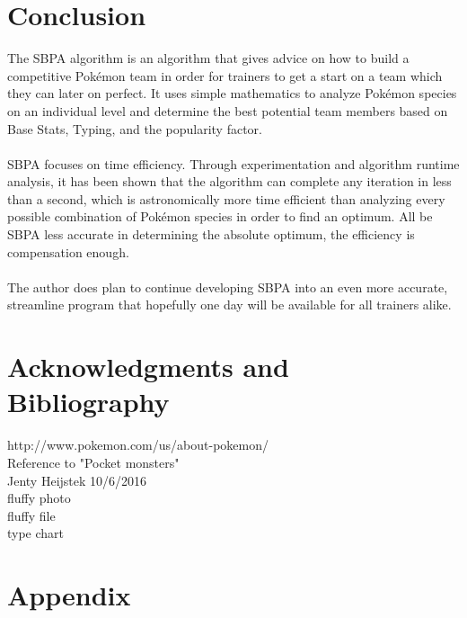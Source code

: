 \documentclass{article}
\begin{document}
\section{Conclusion}
The SBPA algorithm is an algorithm that gives advice on how to build a competitive Pok\'emon team in order for trainers to get a start on a team which they can later on perfect. It uses simple mathematics to analyze Pok\'emon species on an individual level and determine the best potential team members based on Base Stats, Typing, and the popularity factor.\\\\
SBPA focuses on time efficiency. Through experimentation and algorithm runtime analysis, it has been shown that the algorithm can complete any iteration in less than a second, which is astronomically more time efficient than analyzing every possible combination of Pok\'emon species in order to find an optimum. All be SBPA less accurate in determining the absolute optimum, the efficiency is compensation enough.\\\\
The author does plan to continue developing SBPA into an even more accurate, streamline program that hopefully one day will be available for all trainers alike.

\newpage
\section{Acknowledgments and Bibliography}
http://www.pokemon.com/us/about-pokemon/\\
Reference to "Pocket monsters"\\
Jenty Heijstek 10/6/2016\\
fluffy photo\\
fluffy file\\
type chart

\section{Appendix}
\end{document}

